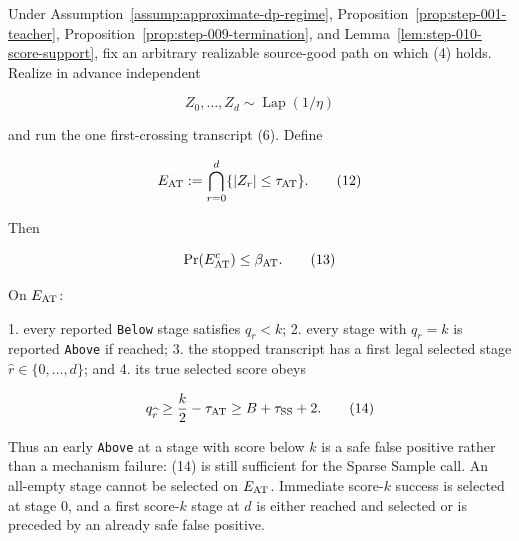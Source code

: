 \begin{proposition}\label{prop:step-010-abovethreshold}
Under Assumption~\ref{assump:approximate-dp-regime}, Proposition~\ref{prop:step-001-teacher}, Proposition~\ref{prop:step-009-termination}, and
Lemma~\ref{lem:step-010-score-support}, fix an arbitrary realizable
source-good path on which (4) holds. Realize in advance independent

\[
 Z_0,\ldots,Z_d\sim\operatorname{Lap}(1/\eta)
\]

and run the one first-crossing transcript (6). Define

\[
 E_{\rm AT}:=\bigcap_{r=0}^d\{|Z_r|\leq\tau_{\rm AT}\}.
 \tag{12}
\]

Then

\[
 \Pr(E_{\rm AT}^c)\leq\beta_{\rm AT}.
 \tag{13}
\]

On \(E_{\rm AT}\):

1. every reported \texttt{Below} stage satisfies \(q_r<k\);
2. every stage with \(q_r=k\) is reported \texttt{Above} if reached;
3. the stopped transcript has a first legal selected stage
   \(\widehat r\in\{0,\ldots,d\}\); and
4. its true selected score obeys

   \[
     q_{\widehat r}
     \geq\frac{k}{2}-\tau_{\rm AT}
     \geq B+\tau_{\rm SS}+2.
     \tag{14}
   \]

Thus an early \texttt{Above} at a stage with score below \(k\) is a safe false
positive rather than a mechanism failure: (14) is still sufficient for the
Sparse Sample call. An all-empty stage cannot be selected on
\(E_{\rm AT}\). Immediate score-\(k\) success is selected at stage \(0\),
and a first score-\(k\) stage at \(d\) is either reached and selected or is
preceded by an already safe false positive.


\end{proposition}

